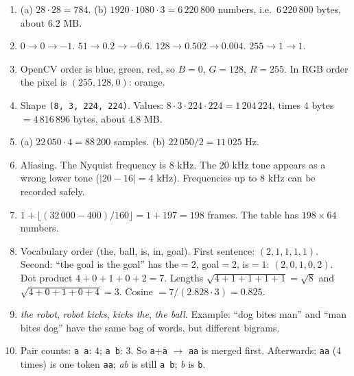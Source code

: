 \begin{enumerate}[label=\textbf{\ansnum.\arabic*}]
  \item (a) $28\cdot28=784$. (b) $1920\cdot1080\cdot3=6\,220\,800$ numbers, i.e.\ $6\,220\,800$ bytes, about $6.2$ MB.
  \item $0\to0\to-1$. $51\to0.2\to-0.6$. $128\to0.502\to0.004$. $255\to1\to1$.
  \item OpenCV order is blue, green, red, so $B=0$, $G=128$, $R=255$. In RGB order the pixel is $(255,128,0)$: orange.
  \item Shape \texttt{(8, 3, 224, 224)}. Values: $8\cdot3\cdot224\cdot224=1\,204\,224$, times $4$ bytes $=4\,816\,896$ bytes, about $4.8$ MB.
  \item (a) $22\,050\cdot4=88\,200$ samples. (b) $22\,050/2=11\,025$ Hz.
  \item Aliasing. The Nyquist frequency is $8$ kHz. The $20$ kHz tone appears as a wrong lower tone ($|20-16|=4$ kHz). Frequencies up to $8$ kHz can be recorded safely.
  \item $1+\lfloor(32\,000-400)/160\rfloor=1+197=198$ frames. The table has $198\times64$ numbers.
  \item Vocabulary order (the, ball, is, in, goal). First sentence: $(2,1,1,1,1)$. Second: ``the goal is the goal'' has the$=2$, goal$=2$, is$=1$: $(2,0,1,0,2)$. Dot product $4+0+1+0+2=7$. Lengths $\sqrt{4+1+1+1+1}=\sqrt8$ and $\sqrt{4+0+1+0+4}=3$. Cosine $=7/(2.828\cdot3)=0.825$.
  \item \emph{the robot}, \emph{robot kicks}, \emph{kicks the}, \emph{the ball}. Example: ``dog bites man'' and ``man bites dog'' have the same bag of words, but different bigrams.
  \item[\textbf{\ansnum.10}] Pair counts: \texttt{a a}: $4$; \texttt{a b}: $3$. So \texttt{a}+\texttt{a} $\to$ \texttt{aa} is merged first. Afterwards: \texttt{aa} (4 times) is one token \texttt{aa}; \emph{ab} is still \texttt{a b}; \emph{b} is \texttt{b}.
\end{enumerate}
